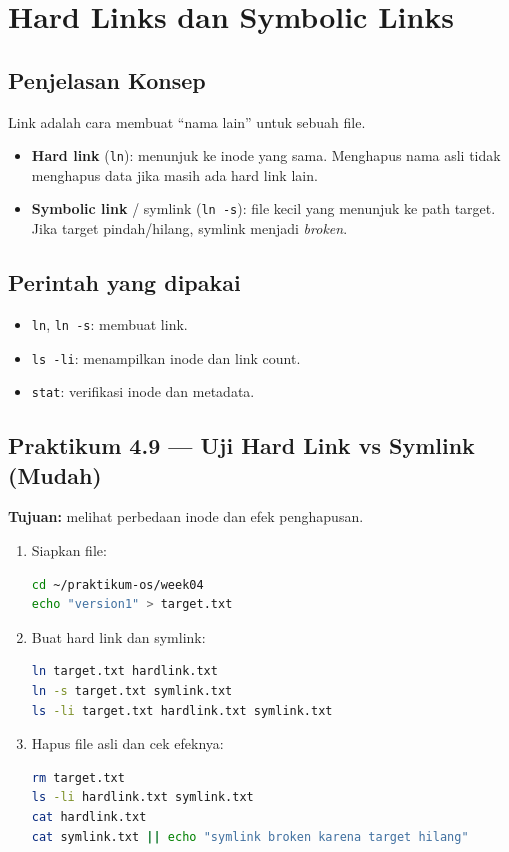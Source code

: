 \section{Hard Links dan Symbolic Links}
\label{sec:links}

\subsection*{Penjelasan Konsep}
Link adalah cara membuat ``nama lain'' untuk sebuah file.
\begin{itemize}
    \item \textbf{Hard link} (\texttt{ln}): menunjuk ke inode yang sama. Menghapus nama asli tidak menghapus data jika masih ada hard link lain.
    \item \textbf{Symbolic link} / symlink (\texttt{ln -s}): file kecil yang menunjuk ke path target. Jika target pindah/hilang, symlink menjadi \textit{broken}.
\end{itemize}

\subsection*{Perintah yang dipakai}
\begin{itemize}
    \item \texttt{ln}, \texttt{ln -s}: membuat link.
    \item \texttt{ls -li}: menampilkan inode dan link count.
    \item \texttt{stat}: verifikasi inode dan metadata.
\end{itemize}

\subsection*{Praktikum 4.9 --- Uji Hard Link vs Symlink (Mudah)}
\textbf{Tujuan:} melihat perbedaan inode dan efek penghapusan.

\begin{enumerate}
    \item Siapkan file:
\begin{lstlisting}[language=bash, caption={Membuat file sumber}]
cd ~/praktikum-os/week04
echo "version1" > target.txt
\end{lstlisting}

    \item Buat hard link dan symlink:
\begin{lstlisting}[language=bash, caption={Membuat hard link dan symlink}]
ln target.txt hardlink.txt
ln -s target.txt symlink.txt
ls -li target.txt hardlink.txt symlink.txt
\end{lstlisting}

    \item Hapus file asli dan cek efeknya:
\begin{lstlisting}[language=bash, caption={Menghapus target dan mengecek link}]
rm target.txt
ls -li hardlink.txt symlink.txt
cat hardlink.txt
cat symlink.txt || echo "symlink broken karena target hilang"
\end{lstlisting}
\end{enumerate}

